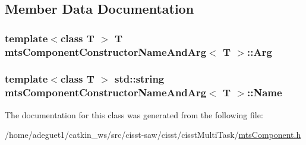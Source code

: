 \subsection{Member Data Documentation}
\hypertarget{classmts_component_constructor_name_and_arg_ac44dbfc39967fa6841d24e575c8ea1fb}{
\subsubsection[{Arg}]{\setlength{\rightskip}{0pt plus 5cm}template$<$class T $>$ T {\bf mts\-Component\-Constructor\-Name\-And\-Arg}$<$ T $>$\-::Arg}}\label{classmts_component_constructor_name_and_arg_ac44dbfc39967fa6841d24e575c8ea1fb}
\hypertarget{classmts_component_constructor_name_and_arg_ad9cb127f100da531c3aac4b949f7aa73}{
\subsubsection[{Name}]{\setlength{\rightskip}{0pt plus 5cm}template$<$class T $>$ std\-::string {\bf mts\-Component\-Constructor\-Name\-And\-Arg}$<$ T $>$\-::Name}}\label{classmts_component_constructor_name_and_arg_ad9cb127f100da531c3aac4b949f7aa73}


The documentation for this class was generated from the following file\-:\begin{DoxyCompactItemize}
\item 
/home/adeguet1/catkin\-\_\-ws/src/cisst-\/saw/cisst/cisst\-Multi\-Task/\hyperlink{mts_component_8h}{mts\-Component.\-h}\end{DoxyCompactItemize}
